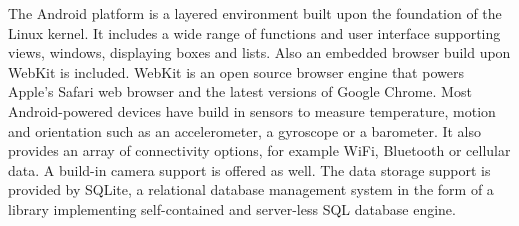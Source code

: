 The Android platform is a layered environment built upon the foundation of the Linux kernel.
It includes a wide range of functions and user interface supporting views, windows, displaying boxes and lists.
Also an embedded browser build upon WebKit is included.
WebKit is an open source browser engine that powers Apple's Safari web browser and the latest versions of Google Chrome.
Most Android-powered devices have build in sensors to measure temperature, motion and orientation 
such as an accelerometer, a gyroscope or a barometer.
It also provides an array of connectivity options, for example WiFi, Bluetooth or cellular data.
A build-in camera support is offered as well.
The data storage support is provided by SQLite, a relational database management system in the form of a library implementing self-contained and server-less SQL database engine.
 
